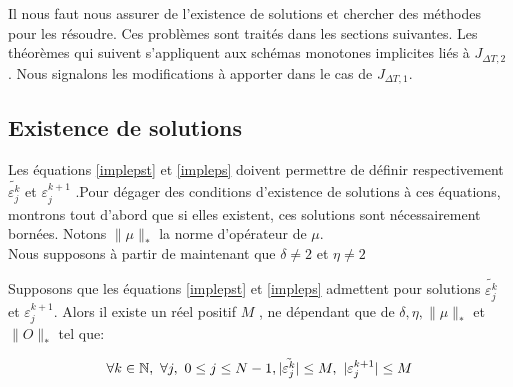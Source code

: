 \begin{itemize}
\begin{enumerate}
	\end{enumerate}
	
\end{itemize}

Il nous faut nous assurer de l'existence de solutions et chercher des méthodes pour les résoudre. Ces problèmes sont traités dans les sections suivantes. Les théorèmes qui suivent s’appliquent aux schémas monotones implicites liés à $ J_{\Delta T,2} $ . Nous signalons les modifications à apporter dans le cas de $ J_{\Delta T,1} $.

\subsection{Existence de solutions}
Les équations \eqref{implepst} et \eqref{impleps} doivent permettre de définir respectivement $ \tilde{\varepsilon^k_j} $ et $ \varepsilon_j^{k+1} $ .Pour dégager des conditions d'existence de solutions à ces équations, montrons tout d'abord que si elles existent, ces solutions sont nécessairement bornées. Notons $ \lVert \mu \rVert_* $ la
norme d'opérateur de $\mu$.\\

Nous supposons à partir de maintenant que $\delta \neq 2$ et $\eta \neq 2$

\begin{theorem} \label{theoborne}
	Supposons que les équations \eqref{implepst} et \eqref{impleps} admettent pour solutions $ \tilde{\varepsilon^k_j} $ et $ \varepsilon_j^{k+1} $. Alors il existe un réel positif $M$ , ne dépendant que de $\delta,\eta,\lVert \mu \rVert_*$ et $\lVert O \rVert_*$ tel que:
	
	$$ \forall k \in \mathbb N,\  \forall j,\  0 \leq j \leq N-1, |\tilde{\varepsilon^k_j}|\leq M,\ |\varepsilon_j^{k+1}| \leq M$$
	
\end{theorem}


